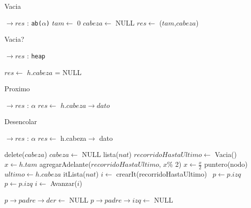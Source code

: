\begin{Algoritmos}



\begin{algorithm}
\caption{Vacia}
\begin{algorithmic}[1]
   $\to res$ : \texttt{ab($\alpha$)}
  \State $tam \gets$ 0
  \State $cabeza \gets$ NULL
  \State $res \gets$ ($tam$,$cabeza$)
 \EndProcedure
\end{algorithmic}
\end{algorithm}


\begin{algorithm}
\caption{Vacia?}
\begin{algorithmic}[1]
   $\to res$ : \texttt{heap}

  \State $res \gets$ $h.cabeza$ = NULL
 \EndProcedure
\end{algorithmic}
\end{algorithm}


\begin{algorithm}
\caption{Proximo}
\begin{algorithmic}[1]
   $\to res$ : $\alpha$
  \State $res \gets$ $h.cabeza \to dato$
 \EndProcedure
\end{algorithmic}
\end{algorithm}



\begin{algorithm}
\caption{Desencolar}
\begin{algorithmic}[1]
   $\to res$ : $\alpha$
  \State $res \gets$ h.cabeza$\to$ dato

    \State delete($cabeza$)
    \State $cabeza \gets$ NULL
  \Else
    \State lista($nat$) $recorridoHastaUltimo \gets$ Vacia()
    \State $x \gets h.tam$
      \State agregarAdelante($recorridoHastaUltimo$, $x$\% 2)
      \State $x \gets \frac{x}{2}$
    \EndWhile
    \State puntero(nodo) $ultimo \gets h.cabeza$
    \State itLista($nat$) $i \gets$ crearIt(recorridoHastaUltimo)
       \ $p \gets p.izq$
      \Else \  $p \gets p.izq$
      \EndIf
      \State $i \gets$ Avanzar($i$)
    \EndWhile
    
      \State $p \to padre \to der \gets$ NULL
    \Else
      \State $p \to padre \to izq \gets$ NULL
    \EndIf
  

\end{algorithmic}
\end{algorithm}
\end{Algoritmos}

